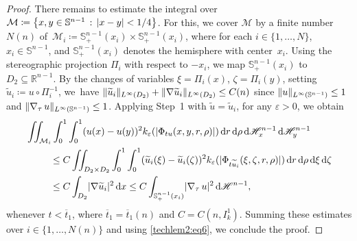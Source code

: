 \documentclass[JEP,XML,SOM,Unicode,published]{cedram}
\newcommand{\sep}{\,:\,}
\numberwithin{equation}{section}
\theoremstyle{plain}
\theoremstyle{definition}
\newcommand{\numberset}[1]{{\mathbb{#1}}}
\newcommand{\R}{\numberset{R}}
\newcommand{\dd}{\mathop{}\mathopen{}\mathrm{d}}
\newcommand{\dx}{\mathop{}\mathopen{}\mathrm{d}x}
\newcommand{\dr}{\mathop{}\mathopen{}\mathrm{d}r}
\newcommand{\dH}{\mathop{}\mathopen{}\mathrm{d}\mathscr{H}}
\newcommand{\bbS}{\mathbb{S}}
\let\eps\varepsilon
\let\ol\overline
\let\wt\widetilde
\newcommand{\grad}{\nabla}
\newcommand{\subsq}{\subseteq}
\DeclarePairedDelimiter{\abs}{\lvert}{\rvert}
\DeclarePairedDelimiter{\norm}{\lVert}{\rVert}
\begin{document}
\begin{proof}
There remains to estimate the integral over
$\mathcal{M}\coloneqq\left\{x,y\in\bbS^{n-1}\sep \abs{x-y}<1/4\right\}$. For this, we cover
$\mathcal{M}$ by a finite number $N(n)$ of~$\mathcal{M}_i\coloneqq \bbS^{n-1}_+(x_i)\times
\bbS^{n-1}_+(x_i)$, where for each $i\in\{1,\dotsc,N\}$, $x_i\in\bbS^{n-1}$, and $\bbS^{n-1}_+(x_i)$
denotes the hemisphere with center~$x_i$. Using the stereographic projection $\Pi_i$ with
respect to $-x_i$, we map $\bbS^{n-1}_+(x_i)$ to $D_2\subsq \R^{n-1}$. By the changes of
variables $\xi=\Pi_i(x)$, $\zeta=\Pi_i(y)$, setting $\wt{u}_i\coloneqq u\circ\Pi_i^{-1}$, we~have $\norm{\wt{u}_i}_{L^\infty(D_2)}+\norm{\grad\wt{u}_i}_{L^\infty(D_2)}\leq C(n)$ since
$\norm{u}_{L^\infty(\bbS^{n-1})}\leq 1$ and $\norm{\grad_\tau\, u}_{L^\infty(\bbS^{n-1})}\leq 1$.
Applying Step~1 with $\wt{u}=\wt{u}_i$, for any $\eps>0$, we obtain
\[
\begin{aligned}
&\iint_{\mathcal{M}_i}\int_0^1\int_0^1 (u(x)-u(y))^2
k_\eps(\abs{\Phi_{tu}(x,y,r,\rho)})\dr\dd\rho\dH_x^{n-1}\dH_y^{n-1}\\
&\hphantom{\iint_{\mathcal{M}_i}}
\leq C\iint_{D_2\times D_2}\int_0^1\int_0^1 (\wt{u}_i(\xi)-\wt{u}_i(\zeta))^2
k_\eps(\abs{\Phi_{t\wt{u}_i}(\xi,\zeta,r,\rho)})\dr\dd\rho\dd\xi\dd\zeta\\
&\hphantom{\iint_{\mathcal{M}_i}}
\leq C\int_{D_2} \abs{\grad \wt{u}_i}^2\dx
\leq C\int_{\bbS^{n-1}_+(x_i)} \abs{\grad_\tau\, u}^2\dH^{n-1},
\end{aligned}
\]
whenever $t<\ol{t}_1$, where $\ol{t}_1=\ol{t}_1(n)$ and $C=C(n,I_k^1)$.
Summing these estimates over $i\in\{1,\dotsc,N(n)\}$ and using \cref{techlem2:eq6}, we conclude the
proof.
\end{proof}

\backmatter


\end{document}
